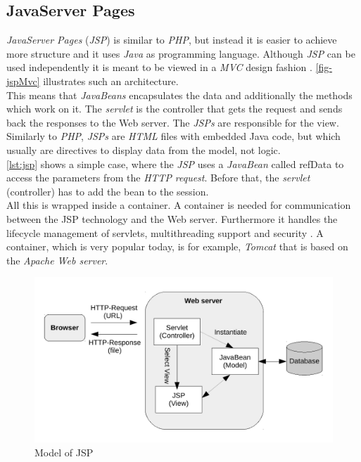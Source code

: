 \documentclass[
  a4paper,               %
  twoside,               %
  headings=small,        %
  DIV=12,                %
  BCOR=1cm,              %
  headinclude=true,      %
  footinclude=true,      %
  numbers=noenddot,      %
  11pt]{scrartcl}        %
\begin{document}
\subsection{JavaServer Pages}

\emph{JavaServer Pages} (\emph{JSP}) is similar to \textit{PHP}, but instead it is easier to achieve more structure and it uses \textit{Java} as programming language. Although \textit{JSP} can be used independently it is meant to be viewed in a \textit{MVC} design fashion \cite{downey2008web}. \autoref{fig-jspMvc} illustrates such an architecture.\\
This means that \textit{JavaBeans} encapsulates the data and additionally the methods which work on it. The \textit{servlet} is the controller that gets the request and sends back the responses to the Web server. The \textit{JSPs} are responsible for the view. Similarly to \textit{PHP}, \textit{JSPs} are \textit{HTML} files with embedded Java code, but which usually are directives to display data from the model, not logic.\\
\autoref{lst:jsp} shows a simple case, where the \textit{JSP} uses a \textit{JavaBean} called refData to access the parameters from the \textit{HTTP} \textit{request}. Before that, the \textit{servlet} (controller) has to add the bean to the session.\\
All this is wrapped inside a container. A container is needed for communication between the JSP technology and the Web server. Furthermore it handles the lifecycle management of servlets, multithreading support and security \cite{downey2008web}. A container, which is very popular today, is for example, \textit{Tomcat} that is based on the \textit{Apache Web server}.

\begin{figure}[h]
  \centerline{\includegraphics[width=12cm]{pics/jspMVC.pdf}}
  \caption{Model of JSP}
  \label{fig-jspMvc}
\end{figure}
\end{document}
